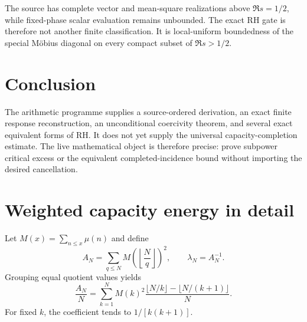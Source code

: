 \documentclass[11pt,a4paper]{article}
\begin{document}
The source has complete vector and mean-square realizations above $\Re s=1/2$, while fixed-phase scalar evaluation remains unbounded. The exact RH gate is therefore not another finite classification. It is local-uniform boundedness of the special M\"obius diagonal on every compact subset of $\Re s>1/2$.

\section{Conclusion}
The arithmetic programme supplies a source-ordered derivation, an exact finite response reconstruction, an unconditional coercivity theorem, and several exact equivalent forms of RH. It does not yet supply the universal capacity-completion estimate. The live mathematical object is therefore precise: prove subpower critical excess or the equivalent completed-incidence bound without importing the desired cancellation.


\section{Weighted capacity energy in detail}
Let $M(x)=\sum_{n\le x}\mu(n)$ and define
\begin{equation}
A_N=\sum_{q\le N}M\!\left(\left\lfloor\frac Nq\right\rfloor\right)^2,
\qquad \lambda_N=A_N^{-1}.
\end{equation}
Grouping equal quotient values yields
\begin{equation}
\frac{A_N}{N}=
\sum_{k=1}^NM(k)^2
\frac{\lfloor N/k\rfloor-\lfloor N/(k+1)\rfloor}{N}.
\end{equation}
For fixed $k$, the coefficient tends to $1/[k(k+1)]$.
\end{document}
